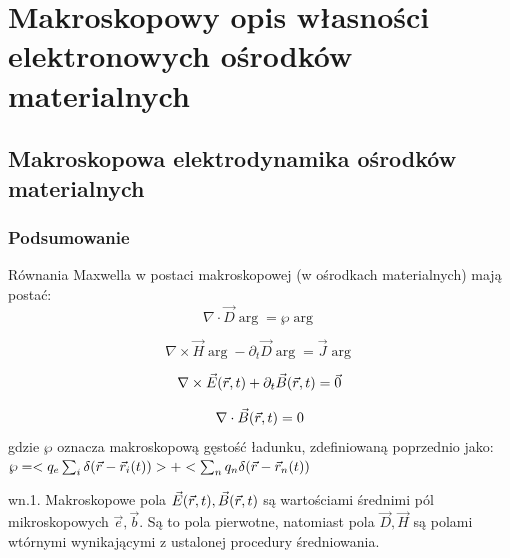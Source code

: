 \section{Makroskopowy opis własności elektronowych ośrodków materialnych}
\subsection{Makroskopowa elektrodynamika ośrodków materialnych}
\subsubsection{Podsumowanie}
Równania Maxwella w postaci makroskopowej (w ośrodkach materialnych) mają postać:
\begin{equation} \nabla \cdot \vec{D}\arg=\wp\arg \label{r1}
 \end{equation}
 
\begin{equation} \nabla \times \vec{H}\arg-\partial_t\vec{D}\arg=\vec{J}\arg \label{r2}
\end{equation}

\begin{equation} \nabla \times \vec{E}(\vec{r},t)+\partial_t \vec{B}(\vec{r},t)=\vec{0} \label{r3}\end{equation} 

\begin{equation} \nabla \cdot \vec{B}(\vec{r},t)=0 \end{equation}
gdzie $\wp$ oznacza makroskopową gęstość ładunku, zdefiniowaną poprzednio jako: $\wp=<q_e\sum_i\delta(\vec{r}-\vec{r}_i(t))>+<\sum_nq_n\delta(\vec{r}-\vec{r}_n(t))$

wn.1. Makroskopowe pola $\vec{E}(\vec{r},t),\vec{B}(\vec{r},t)$ są wartościami średnimi pól mikroskopowych $\vec{e},\vec{b}$. Są to pola pierwotne, natomiast pola $\vec{D},\vec{H}$ są polami wtórnymi wynikającymi z ustalonej procedury średniowania.

